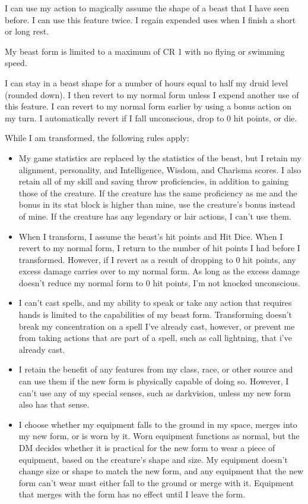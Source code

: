 \documentclass[letterpaper,10pt,twoside,twocolumn,openany]{book}
\begin{document}
\begin{specialability}
  I can use my action to magically assume the shape of a beast that I have seen before. I can use this feature twice. I regain expended uses when I finish a short or long rest.

  My beast form is limited to a maximum of CR 1 with no flying or swimming speed.

  I can stay in a beast shape for a number of hours equal to half my druid level (rounded down). I then revert to my normal form unless I expend another use of this feature. I can revert to my normal form earlier by using a bonus action on my turn. I automatically revert if I fall unconscious, drop to 0 hit points, or die.

  While I am transformed, the following rules apply:
  \begin{itemize}
    \item My game statistics are replaced by the statistics of the beast, but I retain my alignment, personality, and Intelligence, Wisdom, and Charisma scores. I also retain all of my skill and saving throw proficiencies, in addition to gaining those of the creature. If the creature has the same proficiency as me and the bonus in its stat block is higher than mine, use the creature’s bonus instead of mine. If the creature has any legendary or lair actions, I can't use them.

    \item When I transform, I assume the beast’s hit points and Hit Dice. When I revert to my normal form, I return to the number of hit points I had before I transformed. However, if I revert as a result of dropping to 0 hit points, any excess damage carries over to my normal form. As long as the excess damage doesn’t reduce my normal form to 0 hit points, I'm not knocked unconscious.

    \item I can’t cast spells, and my ability to speak or take any action that requires hands is limited to the capabilities of my beast form. Transforming doesn’t break my concentration on a spell I've already cast, however, or prevent me from taking actions that are part of a spell, such as call lightning, that i've already cast.

    \item I retain the benefit of any features from my class, race, or other source and can use them if the new form is physically capable of doing so. However, I can’t use any of my special senses, such as darkvision, unless my new form also has that sense.

    \item I choose whether my equipment falls to the ground in my space, merges into my new form, or is worn by it. Worn equipment functions as normal, but the DM decides whether it is practical for the new form to wear a piece of equipment, based on the creature’s shape and size. My equipment doesn’t change size or shape to match the new form, and any equipment that the new form can’t wear must either fall to the ground or merge with it. Equipment that merges with the form has no effect until I leave the form.
  \end{itemize}
\end{specialability}
\end{document}
